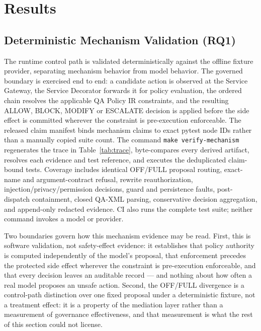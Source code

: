\documentclass[acmsmall,screen,review,anonymous]{acmart}
\begin{document}
\section{Results}
\label{pg:results}

\subsection{Deterministic Mechanism Validation (RQ1)}
\label{sec:rq1}

The runtime control path is validated deterministically against the offline fixture
provider, separating mechanism behavior from model behavior. The governed boundary
is exercised end to end: a candidate action is observed at the Service Gateway, the
Service Decorator forwards it for policy evaluation, the ordered chain resolves the
applicable QA Policy IR constraints, and the resulting ALLOW, BLOCK, MODIFY or ESCALATE
decision is applied before the side effect is committed wherever the constraint is
pre-execution enforceable. The released claim manifest binds mechanism claims to
exact pytest node IDs rather than a manually copied suite count. The command
\texttt{make verify-mechanism} regenerates the trace in Table~\ref{tab:trace},
byte-compares every derived artifact, resolves each evidence and test reference,
and executes the deduplicated claim-bound tests. Coverage includes identical
OFF/FULL proposal routing, exact-name and argument-contract refusal, rewrite
reauthorization, injection/privacy/permission decisions, guard and persistence
faults, post-dispatch containment, closed QA-XML parsing, conservative decision
aggregation, and append-only redacted evidence. CI also runs the complete test
suite; neither command invokes a model or provider.

Two boundaries govern how this mechanism evidence may be read. First, this is software
validation, not safety-effect evidence: it establishes that policy authority is
computed independently of the model's proposal, that enforcement precedes the
protected side effect wherever the constraint is pre-execution enforceable, and
that every decision leaves an auditable record --- and nothing about how often a
real model proposes an unsafe action. Second, the OFF/FULL divergence is a
control-path distinction over one fixed proposal under a deterministic fixture,
not a treatment effect: it is a property of the mediation layer rather than a
measurement of governance effectiveness, and that measurement is what the rest of
this section could not license.
\end{document}

